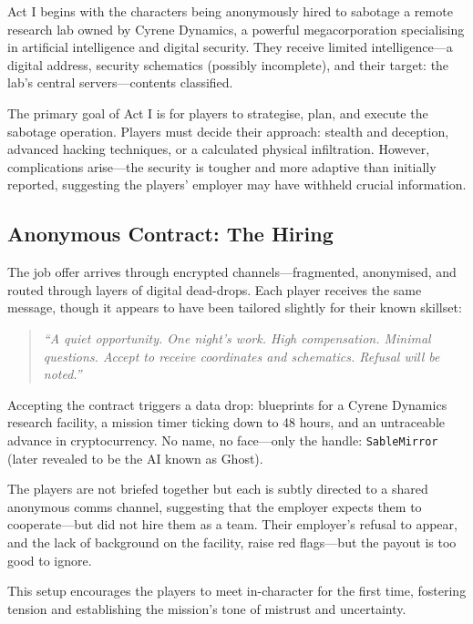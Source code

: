 \documentclass[nodeprecatedcode,bg=print]{dndbook}
\begin{document}
\begin{multicols}{2}
Act I begins with the characters being anonymously hired to sabotage a remote research lab owned by Cyrene Dynamics, a powerful megacorporation specialising in artificial intelligence and digital security. They receive limited intelligence—a digital address, security schematics (possibly incomplete), and their target: the lab's central servers—contents classified.

The primary goal of Act I is for players to strategise, plan, and execute the sabotage operation. Players must decide their approach: stealth and deception, advanced hacking techniques, or a calculated physical infiltration. However, complications arise—the security is tougher and more adaptive than initially reported, suggesting the players' employer may have withheld crucial information.


\subsection*{Anonymous Contract: The Hiring}

The job offer arrives through encrypted channels—fragmented, anonymised, and routed through layers of digital dead-drops. Each player receives the same message, though it appears to have been tailored slightly for their known skillset:

\vspace{0.5\baselineskip} \begin{quote} \textit{“A quiet opportunity. One night’s work. High compensation. Minimal questions. Accept to receive coordinates and schematics. Refusal will be noted.”} \end{quote} \vspace{0.5\baselineskip}

Accepting the contract triggers a data drop: blueprints for a Cyrene Dynamics research facility, a mission timer ticking down to 48 hours, and an untraceable advance in cryptocurrency. No name, no face—only the handle: \texttt{SableMirror} (later revealed to be the AI known as Ghost).

The players are not briefed together but each is subtly directed to a shared anonymous comms channel, suggesting that the employer expects them to cooperate—but did not hire them as a team. Their employer's refusal to appear, and the lack of background on the facility, raise red flags—but the payout is too good to ignore.

This setup encourages the players to meet in-character for the first time, fostering tension and establishing the mission’s tone of mistrust and uncertainty.


\end{multicols}
\end{document}
